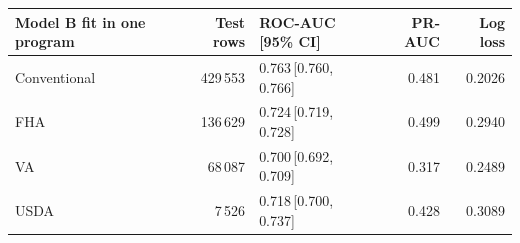 \begin{tabular}{@{}lrlrr@{}}
\toprule
Model B fit in one program & Test rows & ROC-AUC [95\% CI] & PR-AUC & Log loss \\
\midrule
Conventional & 429\,553 & 0.763\,[0.760, 0.766] & 0.481 & 0.2026 \\
FHA & 136\,629 & 0.724\,[0.719, 0.728] & 0.499 & 0.2940 \\
VA & 68\,087 & 0.700\,[0.692, 0.709] & 0.317 & 0.2489 \\
USDA & 7\,526 & 0.718\,[0.700, 0.737] & 0.428 & 0.3089 \\
\bottomrule
\end{tabular}
